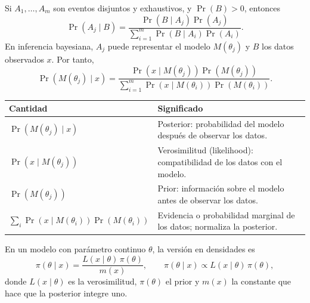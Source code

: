 Si $A_1,\ldots,A_m$ son eventos disjuntos y exhaustivos, y $\Pr(B)>0$, entonces
\[
  \Pr(A_j\mid B)=
  \frac{\Pr(B\mid A_j)\Pr(A_j)}
       {\displaystyle\sum_{i=1}^{m}\Pr(B\mid A_i)\Pr(A_i)}.
\]
En inferencia bayesiana, $A_j$ puede representar el modelo $M(\theta_j)$ y $B$ los datos observados $x$. Por tanto,
\[
  \Pr(M(\theta_j)\mid x)=
  \frac{\Pr(x\mid M(\theta_j))\Pr(M(\theta_j))}
       {\displaystyle\sum_{i=1}^{m}\Pr(x\mid M(\theta_i))\Pr(M(\theta_i))}.
\]

\begin{center}
\begin{tabularx}{0.96\linewidth}{@{}lX@{}}
  \toprule
  Cantidad & Significado\\
  \midrule
  $\Pr(M(\theta_j)\mid x)$ & Posterior: probabilidad del modelo después de observar los datos.\\
  $\Pr(x\mid M(\theta_j))$ & Verosimilitud (likelihood): compatibilidad de los datos con el modelo.\\
  $\Pr(M(\theta_j))$ & Prior: información sobre el modelo antes de observar los datos.\\
  $\sum_i\Pr(x\mid M(\theta_i))\Pr(M(\theta_i))$ & Evidencia o probabilidad marginal de los datos; normaliza la posterior.\\
  \bottomrule
\end{tabularx}
\end{center}

En un modelo con parámetro continuo $\theta$, la versión en densidades es
\[
  \pi(\theta\mid x)=\frac{L(x\mid\theta)\,\pi(\theta)}{m(x)},
  \qquad
  \pi(\theta\mid x)\propto L(x\mid\theta)\,\pi(\theta),
\]
donde $L(x\mid\theta)$ es la verosimilitud, $\pi(\theta)$ el prior y $m(x)$ la constante que hace que la posterior integre uno.

\begin{center}
\end{center}

